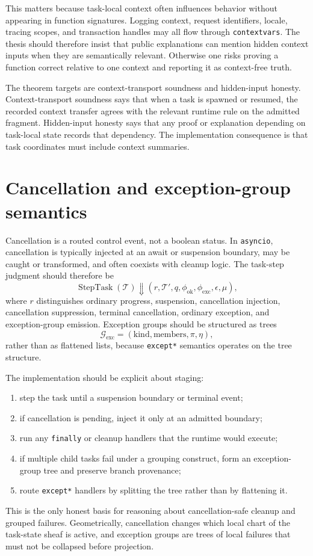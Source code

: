 \documentclass[11pt]{report}
\begin{document}
This matters because task-local context often influences behavior without appearing in function signatures. Logging context, request identifiers, locale, tracing scopes, and transaction handles may all flow through \texttt{contextvars}. The thesis should therefore insist that public explanations can mention hidden context inputs when they are semantically relevant. Otherwise one risks proving a function correct relative to one context and reporting it as context-free truth.

The theorem targets are context-transport soundness and hidden-input honesty. Context-transport soundness says that when a task is spawned or resumed, the recorded context transfer agrees with the relevant runtime rule on the admitted fragment. Hidden-input honesty says that any proof or explanation depending on task-local state records that dependency. The implementation consequence is that task coordinates must include context summaries.
\section{Cancellation and exception-group semantics}
Cancellation is a routed control event, not a boolean status. In \texttt{asyncio}, cancellation is typically injected at an await or suspension boundary, may be caught or transformed, and often coexists with cleanup logic. The task-step judgment should therefore be
\[
\operatorname{StepTask}(\mathcal{T}) \Downarrow (r,\mathcal{T}',q,\phi_{\mathrm{ok}},\phi_{\mathrm{exc}},\epsilon,\mu),
\]
where $r$ distinguishes ordinary progress, suspension, cancellation injection, cancellation suppression, terminal cancellation, ordinary exception, and exception-group emission. Exception groups should be structured as trees
\[
\mathcal{G}_{\mathrm{exc}} = (\mathrm{kind},\mathrm{members},\pi,\eta),
\]
rather than as flattened lists, because \texttt{except*} semantics operates on the tree structure.

The implementation should be explicit about staging:
\begin{enumerate}
\item step the task until a suspension boundary or terminal event;
\item if cancellation is pending, inject it only at an admitted boundary;
\item run any \texttt{finally} or cleanup handlers that the runtime would execute;
\item if multiple child tasks fail under a grouping construct, form an exception-group tree and preserve branch provenance;
\item route \texttt{except*} handlers by splitting the tree rather than by flattening it.
\end{enumerate}
This is the only honest basis for reasoning about cancellation-safe cleanup and grouped failures. Geometrically, cancellation changes which local chart of the task-state sheaf is active, and exception groups are trees of local failures that must not be collapsed before projection.
\end{document}
